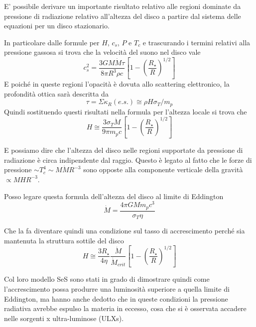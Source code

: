 \documentclass[a4paperbi]{article}
\begin{document}
	E' possibile derivare un importante risultato relativo alle regioni dominate da pressione di radiazione relativo all'altezza del disco a partire dal sistema delle equazioni per un disco stazionario.
	
	In particolare dalle formule per $H$, $c_s$, $P$ e $T_c$ e trascurando i termini relativi alla pressione gassosa si trova che la velocità del suono nel disco vale
	\begin{equation*}
		c_s^2=\frac{3GM\dot{M}\tau}{8\pi R^3\rho c}\left[1-\left(\frac{R_{\star}}{R}\right)^{1/2}\right]
	\end{equation*}
	E poiché in queste regioni l'opacità è dovuta allo scattering elettronico, la profondità ottica sarà descritta da
	\begin{equation*}
		\tau=\Sigma\kappa_R(e.s.)\cong\rho H\sigma_T/m_p
	\end{equation*}
	Quindi sostituendo questi risultati nella formula per l'altezza locale si trova che
	\begin{equation}
		H\cong\frac{3\sigma_T\dot{M}}{9\pi m_pc}\left[1-\left(\frac{R_{\star}}{R}\right)^{1/2}\right]
	\end{equation}
		 
	E possiamo dire che l'altezza del disco nelle regioni supportate da pressione di radiazione è circa indipendente dal raggio. Questo è legato al fatto che le forze di pressione $\sim T_c^4\sim M\dot{M}R^{-3}$ sono opposte alla componente verticale della gravità $\propto MHR^{-3}$.
	
	Posso legare questa formula dell'altezza del disco al limite di Eddington
	\begin{equation*}
		\dot{M}=\frac{4\pi GMm_pc^3}{\sigma_T \eta}
	\end{equation*}
	
	Che la fa diventare quindi una condizione sul tasso di accrescimento perché sia mantenuta la struttura sottile del disco
	\begin{equation}
		H\cong\frac{3R_{\star}}{4\eta}\frac{\dot{M}}{\dot{M}_{crit}}\left[1-\left(\frac{R_{\star}}{R}\right)^{1/2}\right]
	\end{equation}
	
	Col loro modello SeS sono stati in grado di dimostrare quindi come l'accrescimento possa produrre una luminosità superiore a quella limite di Eddington, ma hanno anche dedotto che in queste condizioni la pressione radiativa avrebbe espulso la materia in eccesso, cosa che si è osservata accadere  nelle sorgenti x ultra-luminose (ULXs).
	
\end{document}
